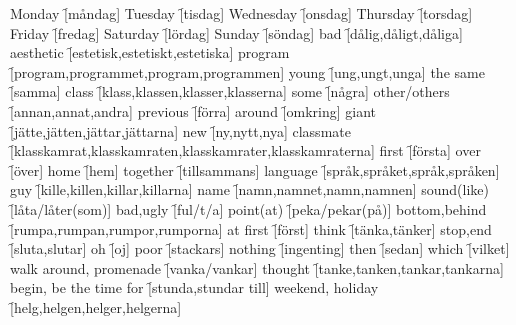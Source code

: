 \begin{questions}
    \begin{multicols}{2}
        \raggedcolumns
        \question Monday \f[måndag]
        \question Tuesday \f[tisdag]
        \question Wednesday \f[onsdag]
        \question Thursday \f[torsdag]
        \question Friday \f[fredag]
        \question Saturday \f[lördag]
        \question Sunday \f[söndag]
        \question bad \f[dålig,dåligt,dåliga]
        \question aesthetic \f[estetisk,estetiskt,estetiska]
        \question program \f[program,programmet,program,programmen]
        \question young \f[ung,ungt,unga]
        \question the same \f[samma]
        \question class \f[klass,klassen,klasser,klasserna]
        \question some \f[några]
        \question other/others \f[annan,annat,andra]
        \question previous \f[förra]
        \question around \f[omkring]
        \question giant \f[jätte,jätten,jättar,jättarna]
        \question new \f[ny,nytt,nya]
        \question classmate \f[klasskamrat,klasskamraten,klasskamrater,klasskamraterna]
        \question first \f[första]
        \question over \f[över]
        \question home \f[hem]
        \question together \f[tillsammans]
        \question language \f[språk,språket,språk,språken]
        \question guy \f[kille,killen,killar,killarna]
        \question name \f[namn,namnet,namn,namnen]
        \question sound(like) \f[låta/låter(som)]
        \question bad,ugly \f[ful/t/a]
        \question point(at) \f[peka/pekar(på)]
        \question bottom,behind \f[rumpa,rumpan,rumpor,rumporna]
        \question at first \f[först]
        \question think \f[tänka,tänker]
        \question stop,end \f[sluta,slutar]
        \question oh \f[oj]
        \question poor \f[stackars]
        \question nothing \f[ingenting]
        \question then \f[sedan]
        \question which \f[vilket]
        \question walk around, promenade \f[vanka/vankar]
        \question thought \f[tanke,tanken,tankar,tankarna]
        \question begin, be the time for \f[stunda,stundar till]
        \question weekend, holiday  \f[helg,helgen,helger,helgerna]
    \end{multicols}
\end{questions}